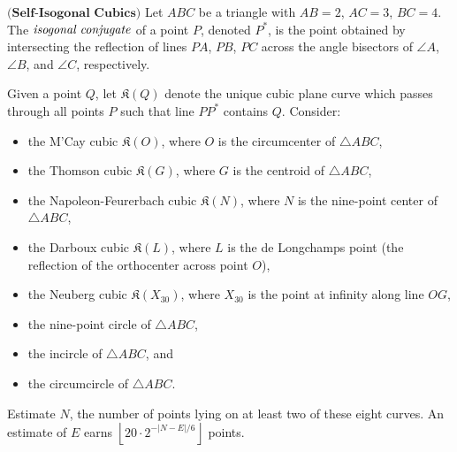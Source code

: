 $\textbf{(Self-Isogonal Cubics)}$ Let $ABC$ be a triangle with $AB = 2$, $AC = 3$, $BC = 4$. The $\emph{isogonal conjugate}$ of a point $P$, denoted $P^\ast$, is the point obtained by intersecting the reflection of lines $PA$, $PB$, $PC$ across the angle bisectors of $\angle A$, $\angle B$, and $\angle C$, respectively.

Given a point $Q$, let $\mathfrak K(Q)$ denote the unique cubic plane curve which passes through all points $P$ such that line $PP^\ast$ contains $Q$.  Consider:
\begin{itemize}
	\item the M'Cay cubic $\mathfrak K(O)$,
where $O$ is the circumcenter of $\triangle ABC$,
	\item the Thomson cubic $\mathfrak K(G)$,
where $G$ is the centroid of $\triangle ABC$,
	\item the Napoleon-Feurerbach cubic $\mathfrak K(N)$,
where $N$ is the nine-point center of $\triangle ABC$,
	\item the Darboux cubic $\mathfrak K(L)$,
where $L$ is the de Longchamps point
(the reflection of the orthocenter across point $O$),
	\item the Neuberg cubic $\mathfrak K(X_{30})$,
where $X_{30}$ is the point at infinity along line $OG$,
	\item the nine-point circle of $\triangle ABC$,
	\item the incircle of $\triangle ABC$, and
	\item the circumcircle of $\triangle ABC$.
\end{itemize}
Estimate $N$, the number of points lying on at least two of these eight curves. An estimate of $E$ earns $\left\lfloor 20 \cdot 2^{-|N-E|/6} \right\rfloor$ points.